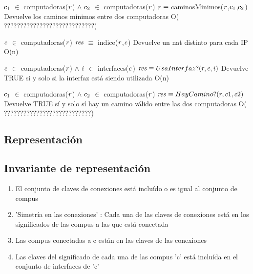  {$\text{\textit{$c_{1}$}}$ $\in$ computadoras($\text{\textit{r}}$) $\land$ $\text{\textit{$c_{2}$}}$ $\in$ computadoras($\text{\textit{r}}$)}
 {$\text{\textit{r}} \equiv$ caminosMinimos($\text{\textit{r}}$,$\text{\textit{$c_{1}$}}$,$\text{\textit{$c_{2}$}}$)}
 {Devuelve los caminos mínimos entre dos computadoras}
 {O($????????????????????????????$)}

 {$\text{\textit{c}}$ $\in$ computadoras($\text{\textit{r}}$)}
 {$\text{\textit{res}}$ $\equiv$ indice($\text{\textit{r}}$,$\text{\textit{c}}$)}
 {Devuelve un nat distinto para cada IP}
 {O(n)}

 {$\text{\textit{c}}$ $\in$ computadoras($\text{\textit{r}}$) $\land$ $\text{\textit{i}}$ $\in$ interfaces($\text{\textit{c}}$)}
 {$\text{\textit{res}} \equiv UsaInterfaz?(r,c,i)$}
 {Devuelve TRUE si y solo si la interfaz está siendo utilizada}
 {O(n)}

 {$\text{\textit{$c_{1}$}}$ $\in$ computadoras($\text{\textit{r}}$) $\land$ $\text{\textit{$c_{2}$}}$ $\in$ computadoras($\text{\textit{r}}$)}
 {$\text{\textit{res}} \equiv HayCamino?(r,c1,c2)$}
 {Devuelve TRUE sí y solo sí hay un camino válido entre las dos computadoras}
 {O($???????????????????????????$)}

\subsection{Representación}

\subsection{Invariante de representación}
\begin{enumerate}
\item El conjunto de claves de conexiones está incluído o es igual al conjunto de compus
\item 'Simetría en las conexiones' : Cada una de las claves de conexiones está en los significados de las compus a las que está conectada
\item Las compus conectadas a c están en las claves de las conexiones
\item Las claves del significado de cada una de las compus 'c' está incluída en el conjunto de interfaces de 'c'
\end{enumerate}

